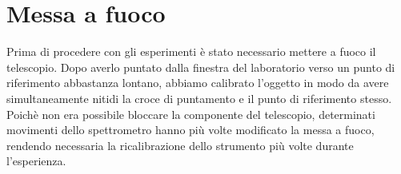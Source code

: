 \section{Messa a fuoco}
Prima di procedere con gli esperimenti è stato necessario mettere a fuoco il telescopio. Dopo averlo puntato dalla finestra del laboratorio verso un punto di riferimento abbastanza lontano, abbiamo calibrato l'oggetto in modo da avere simultaneamente nitidi la croce di puntamento e il punto di riferimento stesso.
Poichè non era possibile bloccare la componente del telescopio, determinati movimenti dello spettrometro hanno più volte modificato la messa a fuoco, rendendo necessaria la ricalibrazione dello strumento più volte durante l'esperienza.
